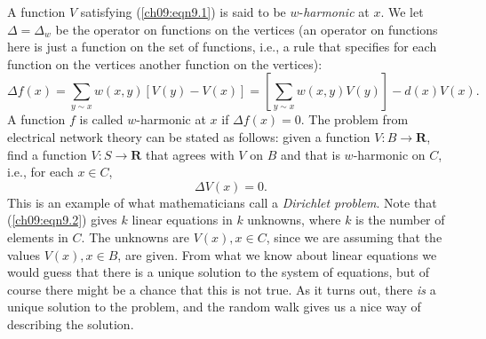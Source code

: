 \documentclass{stml-l}
\theoremstyle{definition}
\numberwithin{equation}{chapter}
\numberwithin{figure}{chapter}
\numberwithin{figure}{section}
\begin{document}
A function $V$ satisfying (\ref{ch09:eqn9.1}) is said to be
$w$-\emph{harmonic} at $x$. We let $\Delta=\Delta_{w}$ be the
operator on functions on the vertices (an operator on functions here
is just a function on the set of functions, i.e., a rule that
specifies for each function on the vertices another function on the
vertices):
\begin{equation*}
\Delta f(x)=\sum\limits_{y\sim
x}w(x,y)[V(y)-V(x)]=\left[\sum\limits_{y\sim
x}w(x,y)V(y)\right]-d(x)V(x).
\end{equation*}
A function $f$ is called $w$-harmonic at $x$ if $\Delta f(x)=0$. The
problem from electrical network theory can be stated as follows:
given a function $V:B\rightarrow \mathbf{R}$, find a function $V:
S\rightarrow \mathbf{R}$ that agrees with $V$ on $B$ and that is
$w$-harmonic on $C$, i.e., for each $x\in C$,
\begin{equation}
\label{ch09:eqn9.2}\Delta V(x)=0.
\end{equation}
This is an example of what mathematicians call a \emph{Dirichlet
problem}. Note that (\ref{ch09:eqn9.2}) gives $k$ linear equations
in $k$ unknowns, where $k$ is the number of elements in $C$. The
unknowns are $V(x),x\in C$, since we are assuming that the values
$V(x),x\in B$, are given. From what we know about linear equations
we would guess that there is a unique solution to the system of
equations, but of course there might be a chance that this is not
true. As it turns out, there \emph{is} a unique solution to the
problem, and the random walk gives us a nice way of describing the
solution.
\end{document}
